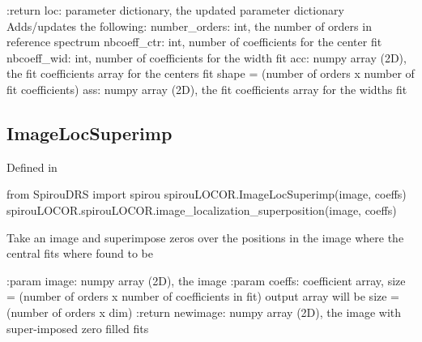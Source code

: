 \begin{minipage}{\textwidth}
\begin{pythondocstring}
:return loc: parameter dictionary, the updated parameter dictionary
        Adds/updates the following:
            number_orders: int, the number of orders in reference spectrum
            nbcoeff_ctr: int, number of coefficients for the center fit
            nbcoeff_wid: int, number of coefficients for the width fit
            acc: numpy array (2D), the fit coefficients array for
                  the centers fit
                  shape = (number of orders x number of fit coefficients)
            ass: numpy array (2D), the fit coefficients array for
                  the widths fit
\end{pythondocstring}
\end{minipage}

\begin{minipage}{\textwidth}
\subsection{ImageLocSuperimp}

Defined in \spirouLOCOR{}

\begin{pythonbox}
from SpirouDRS import spirou
spirouLOCOR.ImageLocSuperimp(image, coeffs)
spirouLOCOR.spirouLOCOR.image_localization_superposition(image, coeffs)
\end{pythonbox}

\begin{pythondocstring}
Take an image and superimpose zeros over the positions in the image where
the central fits where found to be

:param image: numpy array (2D), the image
:param coeffs: coefficient array,
               size = (number of orders x number of coefficients in fit)
               output array will be size = (number of orders x dim)
:return newimage: numpy array (2D), the image with super-imposed zero filled
                  fits
\end{pythondocstring}
\end{minipage}

